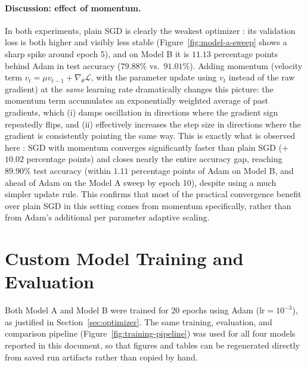 \documentclass[11pt]{article}
\begin{document}
\paragraph{Discussion: effect of momentum.} In both experiments, plain SGD
is clearly the weakest optimizer : its validation loss is both higher and
visibly less stable (Figure~\ref{fig:model-a-sweep} shows a sharp spike
around epoch 5), and on Model B it is $11.13$ percentage points behind
Adam in test accuracy ($79.88\%$ vs.\ $91.01\%$). Adding momentum (velocity term $v_{t} = \mu v_{t-1} +
\nabla_\theta \mathcal{L}$, with the parameter update using $v_t$ instead of
the raw gradient) at the \emph{same} learning rate dramatically changes this
picture: the momentum term accumulates an exponentially weighted average of
past gradients, which (i) damps oscillation in directions where the gradient
sign repeatedly flips, and (ii) effectively increases the step size in
directions where the gradient is consistently pointing the same way. This is
exactly what is observed here : SGD with momentum converges significantly faster
than plain SGD (+$10.02$ percentage points) and closes nearly the entire accuracy gap,
reaching $89.90\%$ test accuracy (within $1.11$ percentage points of Adam on Model B,
and ahead of Adam on the Model A sweep by epoch 10), despite using a much simpler update rule.
This confirms that most of the practical convergence benefit over plain SGD in this setting comes
from momentum specifically, rather than from Adam's additional per parameter
adaptive scaling.

\section{Custom Model Training and Evaluation}
\label{sec:custom-training}

Both Model A and Model B were trained for 20 epochs using Adam
($\text{lr}=10^{-3}$), as justified in Section~\ref{sec:optimizer}. The same
training, evaluation, and comparison pipeline (Figure~\ref{fig:training-pipeline})
was used for all four models reported in this document, so that figures and
tables can be regenerated directly from saved run artifacts rather than
copied by hand.
\end{document}
